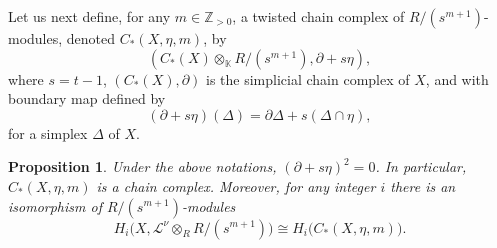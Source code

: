 \documentclass[12pt,leqno,twoside]{amsart}
\theoremstyle{plain}
\newtheorem{prop}[theorem]{Proposition}
\theoremstyle{definition}
\newcommand{\Z}{\mathbb{Z}}
\newcommand{\K}{\mathbb{K}}
\newcommand{\sL}{\mathcal{L}}
\begin{document}
Let us next define, for any $m\in \Z_{>0}$,  a twisted chain complex of $R/(s^{m+1})$-modules, denoted $C_*(X, \eta, m)$, by
\[
\left(C_*(X)\otimes_{\K} R/(s^{m+1}), \partial+s\eta\right),
\]
where $s=t-1$, $(C_*(X), \partial)$ is the simplicial chain complex of $X$, and with boundary map defined by \[(\partial+s\eta)(\Delta)=\partial \Delta+s(\Delta\cap \eta), \] for a simplex $\Delta$ of $X$.
\begin{prop} \label{prop key}
Under the above notations, $(\partial+s\eta)^2=0$. In particular, $C_*(X, \eta, m)$ is a chain complex. Moreover, for any integer $i$ there is an isomorphism of $R/(s^{m+1})$-modules
\begin{equation}\label{eq1}
H_i\big(X, \sL^\nu\otimes_R R/(s^{m+1})\big)\cong H_i\big(C_*(X, \eta, m)\big).
\end{equation}
\end{prop}
\end{document}
